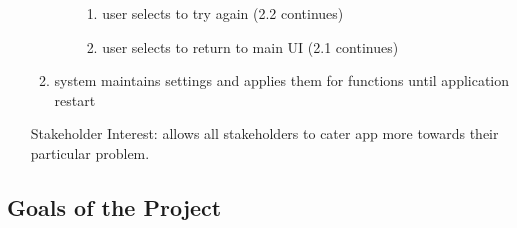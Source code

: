 \documentclass[12pt]{article}
\begin{document}
\begin{enumerate}
\begin{enumerate}
\begin{enumerate}
            \begin{enumerate}

                \item user selects to try again (2.2 continues)

                \item user selects to return to main UI (2.1 continues)

            \end{enumerate}
        
        \end{enumerate}

        \item system maintains settings and applies them for functions until application restart

    \end{enumerate}

    Stakeholder Interest: allows all stakeholders to cater app more towards their particular problem.

\end{enumerate}
\subsection{Goals of the Project}
\end{document}
